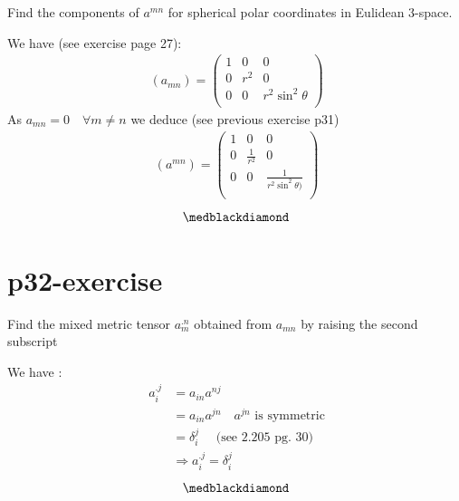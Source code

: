 \begin{tcolorbox}
Find the components of $a^{mn}$ for spherical polar coordinates in Eulidean 3-space.
\end{tcolorbox}
We have (see exercise page 27):
\begin{align}
\ (a_{mn}) = \begin{pmatrix}
 1& 0 & 0\\
0 & r^2 & 0 \\
0 & 0 & r^2\sin^2\theta \\
\end{pmatrix}
\end{align}
As $a_{mn} = 0 \quad \forall m \neq n$ we deduce (see previous exercise p31)
\begin{align}
\ (a^{mn}) = \begin{pmatrix}
 1& 0 & 0\\
0 & \frac{1}{r^2} & 0 \\
0 & 0 & \frac{1}{r^2\sin^2\theta)}\\
\end{pmatrix}
\end{align}
$$\medblackdiamond$$
\newpage

\section{p32-exercise}

\begin{tcolorbox}
Find the mixed metric tensor  $a^{.n}_m$ obtained from $a_{mn}$ by raising the second subscript
\end{tcolorbox}
We have :
\begin{align}
\ a_{i}^{.j} &=  a_{in}a^{nj}\\
\ &=  a_{in}a^{jn}\quad a^{jn} \text{  is symmetric}\\
\ &= \delta^j_i \quad \text{ (see 2.205 pg. 30)}\\
\ &\Rightarrow a_{i}^{.j} = \delta^j_i 
\end{align}
$$\medblackdiamond$$
\newpage

